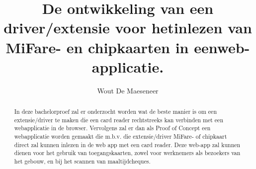 \documentclass{hogent-article}
\title{De ontwikkeling van een driver/extensie voor hetinlezen van MiFare- en chipkaarten in eenweb-applicatie.}
\author{Wout De Maeseneer}
\begin{document}
    
    \begin{abstract}
        In deze bachelorproef zal er onderzocht worden wat de beste manier is om een extensie/driver te maken die een card reader rechtstreeks kan verbinden met een webapplicatie in de browser. Vervolgens zal er dan als Proof of Concept een webapplicatie worden gemaakt die m.b.v. die extensie/driver MiFare- of chipkaart direct zal kunnen inlezen in de web app met een card reader. Deze web-app zal kunnen dienen voor het gebruik van toegangskaarten, zowel voor werknemers als bezoekers van het gebouw, en bij het scannen van maaltijdcheques.
    \end{abstract}
    
    \tableofcontents
    
    
    
    \printbibliography[heading=bibintoc]
    
    
\end{document}
